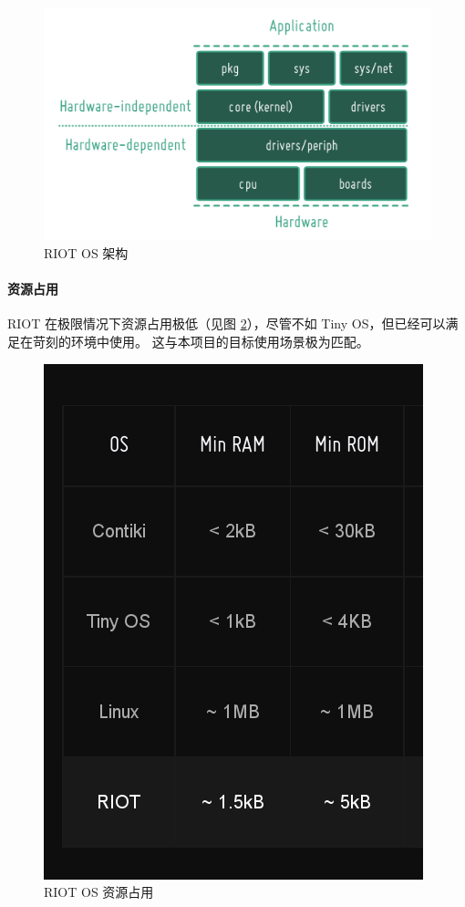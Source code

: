 \documentclass{ctexart}
\begin{document}
\begin{figure}
	\includegraphics[width=\textwidth]{RIOT-Overview.png}
	\caption{RIOT OS 架构}
	\label{RIOT-Overview}
\end{figure}

\paragraph{资源占用}
RIOT 在极限情况下资源占用极低（见图 \ref{RIOT-Resource}），尽管不如 Tiny OS，但已经可以满足在苛刻的环境中使用。
这与本项目的目标使用场景极为匹配。

\begin{figure}
	\centering
	\includegraphics[scale=0.3]{RIOT-Resource.png}
	\caption{RIOT OS 资源占用}
	\label{RIOT-Resource}
\end{figure}
\end{document}
